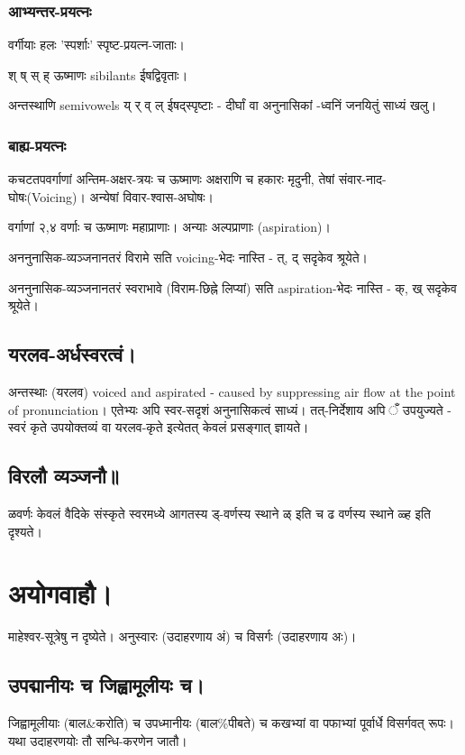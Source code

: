 \documentclass[oneside, article]{memoir}
\begin{document}
\subsubsection{आभ्यन्तर-प्रयत्नः}
वर्गीयाः हलः 'स्पर्शाः' स्पृष्ट-प्रयत्न-जाताः।

श् ष् स् ह् ऊष्माणः sibilants ईषद्विवृताः।

अन्तस्थाणि semivowels य् र् व् ल् ईषद्स्पृष्टाः - दीर्घां वा अनुनासिकां -ध्वनिं जनयितुं साध्यं खलु।

\subsubsection{बाह्य-प्रयत्नः}
कचटतपवर्गाणां अन्तिम-अक्षर-त्रयः च ऊष्माणः अक्षराणि च हकारः मृदुनी, तेषां संवार-नाद-घोषः(Voicing)। अन्येषां विवार-श्वास-अघोषः।

वर्गाणां २,४ वर्णाः च ऊष्माणः महाप्राणाः। अन्याः अल्पप्राणाः (aspiration)।

अननुनासिक-व्यञ्जनानतरं विरामे सति voicing-भेदः नास्ति - त्, द् सदृकेव श्रूयेते।

अननुनासिक-व्यञ्जनानतरं स्वराभावे (विराम-छिह्ने लिप्यां) सति aspiration-भेदः नास्ति - क्, ख् सदृकेव श्रूयेते।

\subsection{यरलव-अर्धस्वरत्वं। }
अन्तस्थाः (यरलव) voiced and aspirated - caused by suppressing air flow at the point of pronunciation। एतेभ्यः अपि स्वर-सदृशं अनुनासिकत्वं साध्यं। तत्-निर्देशाय अपि ँ उपयुज्यते - स्वरं कृते उपयोक्तव्यं वा यरलव-कृते इत्येतत् केवलं प्रसङ्गात् ज्ञायते।

\subsection{विरलौ व्यञ्जनौ॥}
ळवर्णः केवलं वैदिके संस्कृते स्वरमध्ये आगतस्य ड्-वर्णस्य स्थाने ळ् इति च ढ वर्णस्य स्थाने ळ्ह इति दृश्यते।

\section{अयोगवाहौ।}
माहेश्वर-सूत्रेषु न दृष्येते। अनुस्वारः (उदाहरणाय अं) च विसर्गः (उदाहरणाय अः)।

\subsection{उपद्मानीयः च जिह्वामूलीयः च।}
जिह्वामूलीयाः (बाल\&करोति) च उपध्मानीयः (बाल\%पीबते) च कखभ्यां वा पफाभ्यां पूर्वार्धे विसर्गवत् रूपः। यथा उदाहरणयोः तौ सन्धि-करणेन जातौ।
\end{document}
